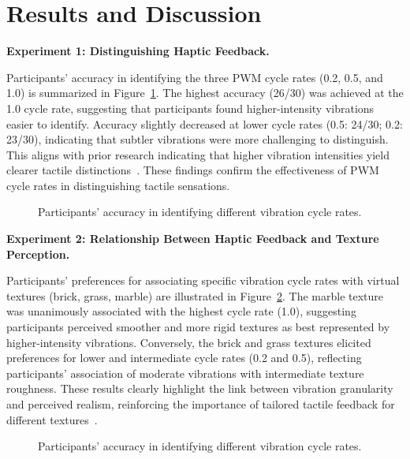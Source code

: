 \documentclass[graybox]{svmult}
\begin{document}
\section{Results and Discussion}

\textbf{Experiment 1: Distinguishing Haptic Feedback.}  

Participants' accuracy in identifying the three PWM cycle rates (0.2, 0.5, and 1.0) is summarized in Figure~\ref{fig:ex1_results}. The highest accuracy (26/30) was achieved at the 1.0 cycle rate, suggesting that participants found higher-intensity vibrations easier to identify. Accuracy slightly decreased at lower cycle rates (0.5: 24/30; 0.2: 23/30), indicating that subtler vibrations were more challenging to distinguish. This aligns with prior research indicating that higher vibration intensities yield clearer tactile distinctions~\cite{strohmeier2017generating,bensmaia2005vibrations}. These findings confirm the effectiveness of PWM cycle rates in distinguishing tactile sensations.

\begin{figure}\centering
	
	\caption{Participants' accuracy in identifying different vibration cycle rates.}\label{fig:ex1_results}
\end{figure}

\textbf{Experiment 2: Relationship Between Haptic Feedback and Texture Perception.}

Participants' preferences for associating specific vibration cycle rates with virtual textures (brick, grass, marble) are illustrated in Figure~\ref{fig:ex2_results}. The marble texture was unanimously associated with the highest cycle rate (1.0), suggesting participants perceived smoother and more rigid textures as best represented by higher-intensity vibrations. Conversely, the brick and grass textures elicited preferences for lower and intermediate cycle rates (0.2 and 0.5), reflecting participants' association of moderate vibrations with intermediate texture roughness. These results clearly highlight the link between vibration granularity and perceived realism, reinforcing the importance of tailored tactile feedback for different textures~\cite{otake2022vibrotactile}.

\begin{figure}\centering
	
	\caption{Participants' accuracy in identifying different vibration cycle rates.}\label{fig:ex2_results}
\end{figure}
\end{document}
